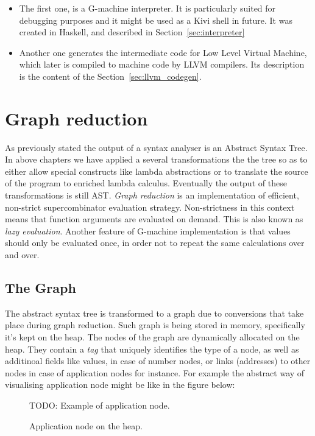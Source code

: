 \documentclass[12pt,a4paper]{report}
\begin{document}
\begin{itemize}
  \item The first one, is a G-machine interpreter. It is particularly suited
    for debugging purposes and it might be used as a Kivi shell in future. It
    was created in Haskell, and described in Section~\ref{sec:interpreter}
  \item Another one generates the intermediate code for Low Level Virtual
    Machine, which later is compiled to machine code by LLVM compilers. Its
    description is the content of the Section~\ref{sec:llvm_codegen}.
\end{itemize}

\section{Graph reduction}
\label{sec:graph_reduction}
As previously stated the output of a syntax analyser is an Abstract Syntax
Tree. In above chapters we have applied a several transformations the the tree
so as to either allow special constructs like lambda abstractions or to
translate the source of the program to enriched lambda calculus. Eventually the
output of these transformations is still AST. \textit{Graph reduction} is an
implementation of efficient, non-strict supercombinator evaluation strategy.
Non-strictness in this context means that function arguments are evaluated on
demand. This is also known as \textit{lazy evaluation}. Another feature of
G-machine implementation is that values should only be evaluated once, in order
not to repeat the same calculations over and over.

\subsection{The Graph}
The abstract syntax tree is transformed to a graph due to conversions that take
place during graph reduction. Such graph is being stored in memory,
specifically it's kept on the heap. The nodes of the graph are dynamically
allocated on the heap. They contain a \textit{tag} that uniquely identifies the
type of a node, as well as additinoal fields like values, in case of number
nodes, or links (addresses) to other nodes in case of application nodes for
instance. For example the abstract way of visualising application node might be
like in the figure below:

\begin{figure}[h!]
  \centering

  TODO: Example of application node.

  \caption{Application node on the heap.}
  \label{fig:application_node}
\end{figure}
\end{document}
